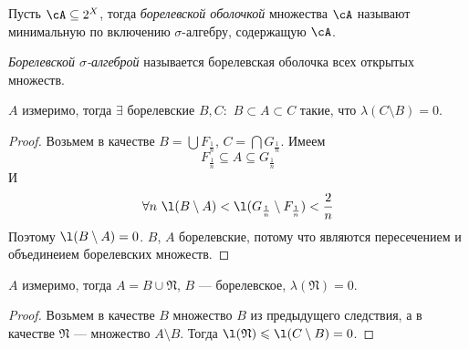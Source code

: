 \begin{definition}
    Пусть $\cA \subseteq 2^X$, тогда \textit{борелевской оболочкой} множества $\cA$
    называют минимальную по включению $\sigma$-алгебру, содержащую $\cA$.
\end{definition}

\begin{definition}
    \textit{Борелевской $\sigma$-алгеброй} называется борелевская оболочка
    всех открытых множеств.
\end{definition}

\begin{corollary}
    $A$ измеримо, тогда $\exists$ борелевские $B, C\colon$ $B \subset A \subset C$
    такие, что $\lambda(C \setminus B) = 0$.
\end{corollary}
\begin{proof}
	Возьмем в качестве $B = \bigcup{F_{\frac{1}{n}}}$, $C = \bigcap{G_{\frac{1}{n}}}$.
	Имеем
\[
	F_{\frac{1}{n}} \subseteq A \subseteq G_{\frac{1}{n}}
\]
	И
\[
	\forall n~ \l(B \setminus A) < \l(G_{\frac{1}{n}} \setminus F_{\frac{1}{n}}) < \frac{2}{n}
\]
	Поэтому $\l(B \setminus A) = 0$. $B$, $A$ борелевские, потому что являются пересечением 
	и объединеием борелевских множеств.
\end{proof}

\begin{corollary}
    $A$ измеримо, тогда $A = B \cup \mathfrak{N}$, $B$ --- борелевское,
    $\lambda(\mathfrak{N}) = 0$.
\end{corollary}
\begin{proof}
	Возьмем в качестве $B$ множество $B$ из предыдущего следствия, а в качестве 
	$\mathfrak{N}$ --- множество $A \setminus B$. Тогда $\l(\mathfrak{N}) \leqslant
	\l(C \setminus B) = 0$.
\end{proof}

